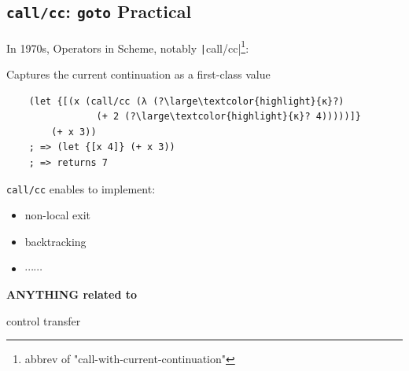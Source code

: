 \subsection{\texttt{call/cc}: \texttt{goto} Practical}
\begin{frame}[fragile]
	\frametitlesubs

	In 1970s, Operators in Scheme\cite{sussman1975scheme}, notably \texttt|call/cc|\cite{scheme1978revised}\footnote{abbrev of "call-with-current-continuation"}:

	Captures the current continuation as a first-class value

	\begin{verbatim}
    (let {[(x (call/cc (λ (?\large\textcolor{highlight}{κ}?)
                (+ 2 (?\large\textcolor{highlight}{κ}? 4)))))]}
        (+ x 3))
    ; => (let {[x 4]} (+ x 3))
    ; => returns 7
  \end{verbatim}

	\pause
	\texttt{call/cc} enables to implement:

	\begin{minipage}{.3\textwidth}
		\begin{itemize}
			\item[\emoji{check-mark-button}] non-local exit
			\item[\emoji{check-mark-button}] backtracking
			\item[] $\cdots\cdots$
		\end{itemize}
	\end{minipage}
	\begin{minipage}{.64\textwidth}
		\pause
		{\Huge {}}
		\Large
		\parbox{.85\textwidth}{%
			\color{highlight}
			\bf
			\centering
			ANYTHING related to

			\boldslant control transfer%
		}
	\end{minipage}
\end{frame}

